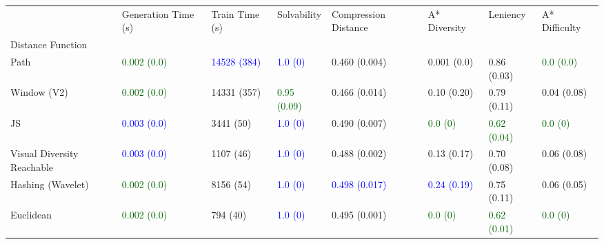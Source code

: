\begin{tabular}{llllllll}
\toprule
{} &                 Generation Time (s) &                   Train Time (s) &                         Solvability &                  Compression Distance &                    A* Diversity &                            Leniency &                     A* Difficulty \\
Distance Function           &                                     &                                  &                                     &                                       &                                 &                                     &                                   \\
\midrule
Path                        &  \textcolor{darkgreen}{0.002 (0.0)} &    \textcolor{blue}{14528 (384)} &           \textcolor{blue}{1.0 (0)} &                         0.460 (0.004) &                     0.001 (0.0) &                         0.86 (0.03) &  \textcolor{darkgreen}{0.0 (0.0)} \\
Window (V2)                 &  \textcolor{darkgreen}{0.002 (0.0)} &                      14331 (357) &  \textcolor{darkgreen}{0.95 (0.09)} &                         0.466 (0.014) &                     0.10 (0.20) &                         0.79 (0.11) &                       0.04 (0.08) \\
JS                          &       \textcolor{blue}{0.003 (0.0)} &                        3441 (50) &           \textcolor{blue}{1.0 (0)} &                         0.490 (0.007) &  \textcolor{darkgreen}{0.0 (0)} &  \textcolor{darkgreen}{0.62 (0.04)} &    \textcolor{darkgreen}{0.0 (0)} \\
Visual Diversity Reachable  &       \textcolor{blue}{0.003 (0.0)} &                        1107 (46) &           \textcolor{blue}{1.0 (0)} &                         0.488 (0.002) &                     0.13 (0.17) &                         0.70 (0.08) &                       0.06 (0.08) \\
Hashing (Wavelet)           &  \textcolor{darkgreen}{0.002 (0.0)} &                        8156 (54) &           \textcolor{blue}{1.0 (0)} &       \textcolor{blue}{0.498 (0.017)} &   \textcolor{blue}{0.24 (0.19)} &                         0.75 (0.11) &                       0.06 (0.05) \\
Euclidean                   &  \textcolor{darkgreen}{0.002 (0.0)} &                         794 (40) &           \textcolor{blue}{1.0 (0)} &                         0.495 (0.001) &  \textcolor{darkgreen}{0.0 (0)} &  \textcolor{darkgreen}{0.62 (0.01)} &    \textcolor{darkgreen}{0.0 (0)} \\

\end{tabular}
